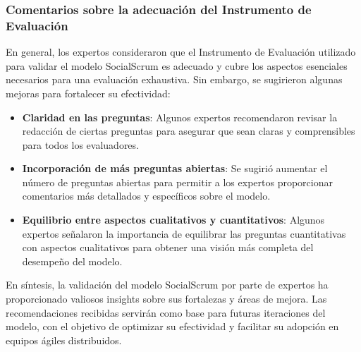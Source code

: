 \subsubsection{Comentarios sobre la adecuación del Instrumento de Evaluación}
En general, los expertos consideraron que el Instrumento de Evaluación utilizado para validar el modelo SocialScrum es adecuado y cubre los aspectos esenciales necesarios para una evaluación exhaustiva. Sin embargo, se sugirieron algunas mejoras para fortalecer su efectividad:
\begin{itemize}
    \item \textbf{Claridad en las preguntas}: Algunos expertos recomendaron revisar la redacción de ciertas preguntas para asegurar que sean claras y comprensibles para todos los evaluadores.
    \item \textbf{Incorporación de más preguntas abiertas}: Se sugirió aumentar el número de preguntas abiertas para permitir a los expertos proporcionar comentarios más detallados y específicos sobre el modelo.
    \item \textbf{Equilibrio entre aspectos cualitativos y cuantitativos}: Algunos expertos señalaron la importancia de equilibrar las preguntas cuantitativas con aspectos cualitativos para obtener una visión más completa del desempeño del modelo.
\end{itemize}

En síntesis, la validación del modelo SocialScrum por parte de expertos ha proporcionado valiosos insights sobre sus fortalezas y áreas de mejora. Las recomendaciones recibidas servirán como base para futuras iteraciones del modelo, con el objetivo de optimizar su efectividad y facilitar su adopción en equipos ágiles distribuidos.
